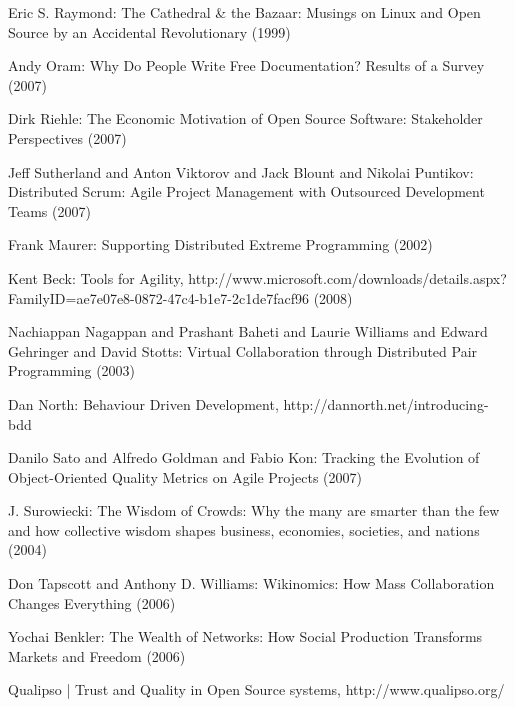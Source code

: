\documentclass[lnbip]{svmultln}
\begin{document}
\begin{thebibliography}{5}
 Eric S. Raymond: The Cathedral \& the Bazaar:
  Musings on {Linux} and Open Source by an Accidental Revolutionary
  (1999)

 Andy Oram: Why Do People Write Free Documentation?
  Results of a Survey (2007)

 Dirk Riehle: The Economic Motivation of Open
  Source Software: Stakeholder Perspectives (2007)

 Jeff Sutherland and Anton Viktorov and Jack
  Blount and Nikolai Puntikov: Distributed Scrum: Agile Project
  Management with Outsourced Development Teams (2007)

 Frank Maurer: Supporting Distributed Extreme
  Programming (2002)

 Kent Beck: Tools for Agility,
  http://www.microsoft.com/downloads/details.aspx?FamilyID=ae7e07e8-0872-47c4-b1e7-2c1de7facf96
  (2008)

 Nachiappan Nagappan and Prashant Baheti and
  Laurie Williams and Edward Gehringer and David Stotts: Virtual
  Collaboration through Distributed Pair Programming (2003)

 Dan North: Behaviour Driven Development,
  http://dannorth.net/introducing-bdd

 Danilo Sato and Alfredo Goldman and Fabio Kon:
  Tracking the Evolution of Object-Oriented Quality Metrics on Agile
  Projects (2007)

 J. Surowiecki: The Wisdom of Crowds: Why the
  many are smarter than the few and how collective wisdom shapes
  business, economies, societies, and nations (2004)

 Don Tapscott and Anthony D. Williams:
  Wikinomics: How Mass Collaboration Changes Everything (2006)

 Yochai Benkler: The Wealth of Networks: How
  Social Production Transforms Markets and Freedom (2006)

 Qualipso | Trust and Quality in Open Source
  systems, http://www.qualipso.org/

\end{thebibliography}
\end{document}
